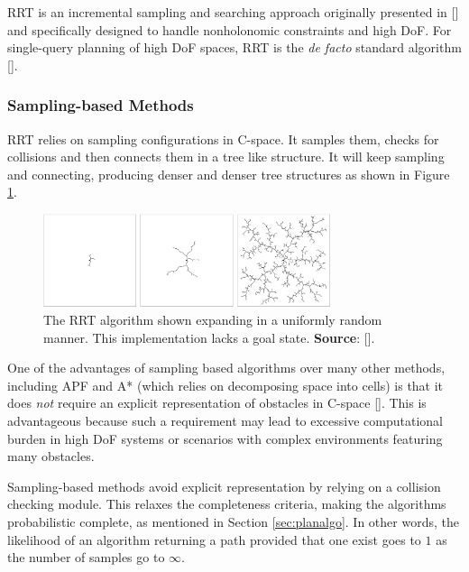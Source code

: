 \gls{RRT} is an incremental sampling and searching approach originally presented in [\citeauthor{LaValle1998}] and specifically designed to handle nonholonomic constraints and high \gls{DoF}. For single-query planning of high \gls{DoF} spaces, \gls{RRT} is the \textit{de facto} standard algorithm [\citeauthor{Akgun2011}].

\subsubsection{Sampling-based Methods}

\gls{RRT} relies on sampling configurations in C-space. It samples them, checks for collisions and then connects them in a tree like structure. It will keep sampling and connecting, producing denser and denser tree structures as shown in Figure \ref{fig:RRT_treeVanilla}.

\begin{figure}[h]
	\centering
	\includegraphics[width=0.75\textwidth]{import/RRT_exploration_tree.png}
	\caption{The RRT algorithm shown expanding in a uniformly random manner. This implementation lacks a goal state. \textbf{Source}: [\citeauthor{Cheng2001}].}
	\label{fig:RRT_treeVanilla}
\end{figure}

One of the advantages of sampling based algorithms over many other methods, including \gls{APF} and A* (which relies on decomposing space into cells) is that it does \textit{not} require an explicit representation of obstacles in C-space [\citeauthor{Karaman2011}]. This is advantageous because such a requirement may lead to excessive computational burden in high \gls{DoF} systems or scenarios with complex environments featuring many obstacles.

Sampling-based methods avoid explicit representation by relying on a collision checking module. This relaxes the completeness criteria, making the algorithms probabilistic complete, as mentioned in Section \ref{sec:planalgo}. In other words, the likelihood of an algorithm returning a path provided that one exist goes to $1$ as the number of samples go to $\infty$.


